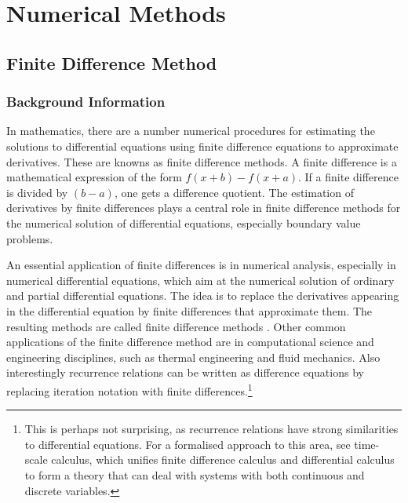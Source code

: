 \documentclass[aps,twocolumn,pre,nofootinbib,10pt]{revtex4-1}
\begin{document}
\section{Numerical Methods \label{sec:met}}

 
\subsection{Finite Difference Method}

\subsubsection{Background Information}

\par\hspace{4mm} In mathematics, there are a number numerical procedures for estimating the solutions to differential equations using finite difference equations to approximate derivatives. These are knowns as finite difference methods. A finite difference is a mathematical expression of the form \(f(x + b) - f(x + a)\). If a finite difference is divided by \((b - a)\), one gets a difference quotient. The estimation of derivatives by finite differences plays a central role in finite difference methods for the numerical solution of differential equations, especially boundary value problems.
\vspace{5mm} \par \indent An essential application of finite differences is in numerical analysis, especially in numerical differential equations, which aim at the numerical solution of ordinary and partial differential equations. The idea is to replace the derivatives appearing in the differential equation by finite differences that approximate them. The resulting methods are called finite difference methods \cite{compmethods}. Other common applications of the finite difference method are in computational science and engineering disciplines, such as thermal engineering and fluid mechanics. Also interestingly recurrence relations can be written as difference equations by replacing iteration notation with finite differences.\footnote{This is perhaps not surprising, as recurrence relations have strong similarities to differential equations. For a formalised approach to this area, see time-scale calculus, which unifies finite difference calculus and differential calculus to form a theory that can deal with 
systems with both 
continuous and discrete variables.}
\end{document}
